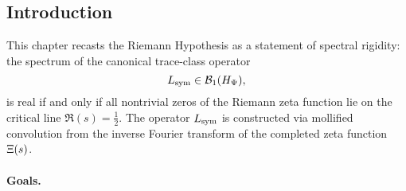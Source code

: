 \subsection*{Introduction}


This chapter recasts the Riemann Hypothesis as a statement of spectral rigidity: the spectrum of the canonical trace-class operator
\[
L_{\mathrm{sym}} \in \mathcal{B}_1(H_{\Psi}),
\]
is real if and only if all nontrivial zeros of the Riemann zeta function lie on the critical line \( \Re(s) = \tfrac{1}{2} \). The operator \( L_{\mathrm{sym}} \) is constructed via mollified convolution from the inverse Fourier transform of the completed zeta function \( \Xi(s) \).

\paragraph{Goals.}
